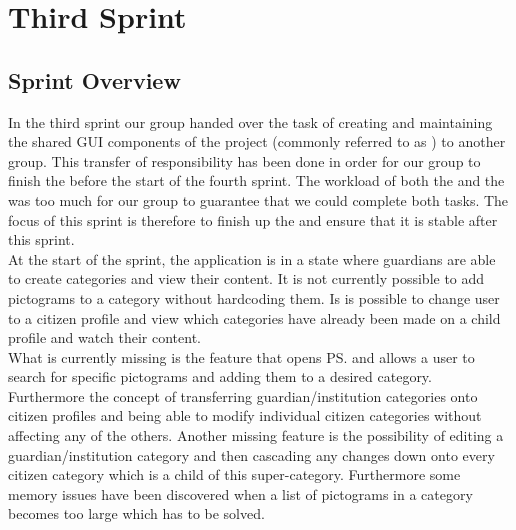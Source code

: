 \part{Third Sprint}
\label{par:third_sprint}

\chapter{Sprint Overview}
In the third sprint our group handed over the task of creating and maintaining the shared GUI components of the project (commonly referred to as \gc) to another group. This transfer of responsibility has been done in order for our group to finish the \ct before the start of the fourth sprint. The workload of both the \ct and the \gc was too much for our group to guarantee that we could complete both tasks. The focus of this sprint is therefore to finish up the \ct and ensure that it is stable after this sprint.\\

At the start of the sprint, the application is in a state where guardians are able to create categories and view their content. It is not currently possible to add pictograms to a category without hardcoding them. Is is possible to change user to a citizen profile and view which categories have already been made on a child profile and watch their content. \\

What is currently missing is the feature that opens \ps and allows a user to search for specific pictograms and adding them to a desired category. Furthermore the concept of transferring guardian/institution categories onto citizen profiles and being able to modify individual citizen categories without affecting any of the others. Another missing feature is the possibility of editing a guardian/institution category and then cascading any changes down onto every citizen category which is a child of this super-category. Furthermore some memory issues have been discovered when a list of pictograms in a category becomes too large which has to be solved. 




